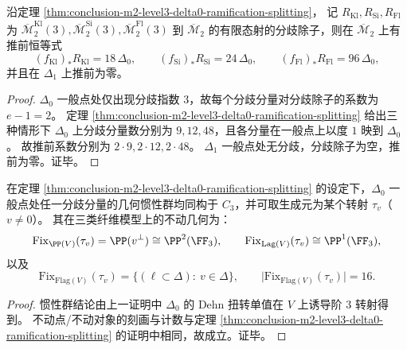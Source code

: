 \begin{corollary}\label{cor:conclusion-m2-level3-delta0-ramification-pushforward}
沿定理 \ref{thm:conclusion-m2-level3-delta0-ramification-splitting}，
记 \(R_{\mathrm{Kl}},R_{\mathrm{Si}},R_{\mathrm{Fl}}\) 为
\(
\overline{\mathcal M}_2^{\mathrm{Kl}}(3),
\overline{\mathcal M}_2^{\mathrm{Si}}(3),
\overline{\mathcal M}_2^{\mathrm{Fl}}(3)
\)
到 \(\overline{\mathcal M}_2\) 的有限态射的分歧除子，则在 \(\overline{\mathcal M}_2\) 上有推前恒等式
\[
(f_{\mathrm{Kl}})_*R_{\mathrm{Kl}}=18\,\Delta_0,\qquad
(f_{\mathrm{Si}})_*R_{\mathrm{Si}}=24\,\Delta_0,\qquad
(f_{\mathrm{Fl}})_*R_{\mathrm{Fl}}=96\,\Delta_0,
\]
并且在 \(\Delta_1\) 上推前为零。
\end{corollary}
\begin{proof}
\(\Delta_0\) 一般点处仅出现分歧指数 \(3\)，故每个分歧分量对分歧除子的系数为 \(e-1=2\)。
定理 \ref{thm:conclusion-m2-level3-delta0-ramification-splitting} 给出三种情形下 \(\Delta_0\) 上分歧分量数分别为 \(9,12,48\)，且各分量在一般点上以度 \(1\) 映到 \(\Delta_0\)。
故推前系数分别为 \(2\cdot 9,2\cdot 12,2\cdot 48\)。
\(\Delta_1\) 一般点处无分歧，分歧除子为空，推前为零。证毕。
\end{proof}

\begin{proposition}\label{prop:conclusion-m2-level3-delta0-inertia-fixed-geometry}
在定理 \ref{thm:conclusion-m2-level3-delta0-ramification-splitting} 的设定下，\(\Delta_0\) 一般点处任一分歧分量的几何惯性群均同构于 \(C_3\)，并可取生成元为某个转射 \(\tau_v\)（\(v\neq 0\)）。
其在三类纤维模型上的不动几何为：
\[
\mathrm{Fix}_{\PP(V)}(\tau_v)=\PP(v^\perp)\cong \PP^2(\FF_3),
\qquad
\mathrm{Fix}_{\mathrm{Lag}(V)}(\tau_v)\cong \PP^1(\FF_3),
\]
以及
\[
\mathrm{Fix}_{\mathrm{Flag}(V)}(\tau_v)=\{(\ell\subset \Delta):\ v\in \Delta\},
\qquad
\bigl|\mathrm{Fix}_{\mathrm{Flag}(V)}(\tau_v)\bigr|=16.
\]
\end{proposition}
\begin{proof}
惯性群结论由上一证明中 \(\Delta_0\) 的 Dehn 扭转单值在 \(V\) 上诱导阶 \(3\) 转射得到。
不动点/不动对象的刻画与计数与定理 \ref{thm:conclusion-m2-level3-delta0-ramification-splitting} 的证明中相同，故成立。证毕。
\end{proof}

